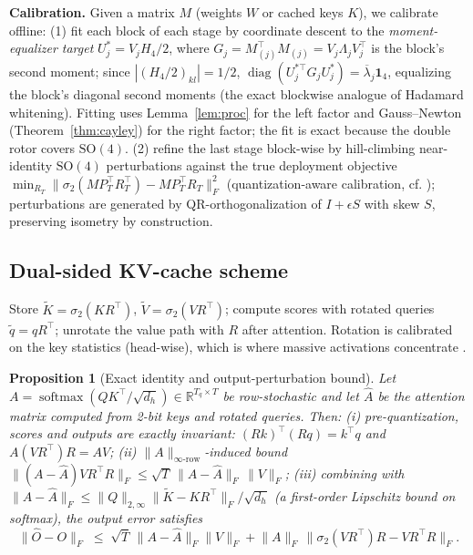 \documentclass{article}
\newtheorem{proposition}{Proposition}
\newcommand{\R}{\mathbb{R}}
\newcommand{\SO}{\mathrm{SO}}
\newcommand{\norm}[1]{\lVert #1 \rVert}
\begin{document}
\textbf{Calibration.} Given a matrix $M$ (weights $W$ or cached keys $K$), we
calibrate offline: (1) fit each block of each stage by coordinate descent to
the \emph{moment-equalizer target}
$U^{*}_j=V_jH_4/2$, where $G_j=M_{(j)}^\top M_{(j)}=V_j\Lambda_jV_j^\top$ is
the block's second moment; since $|(H_4/2)_{kl}|=1/2$,
$\operatorname{diag}(U^{*\top}_jG_jU^{*}_j)=\overline{\lambda}_j\mathbf{1}_4$,
equalizing the block's diagonal second moments (the exact blockwise analogue
of Hadamard whitening). Fitting uses Lemma~\ref{lem:proc} for the left factor
and Gauss--Newton (Theorem~\ref{thm:cayley}) for the right factor; the fit is
exact because the double rotor covers $\SO(4)$. (2) refine the last stage
block-wise by hill-climbing near-identity $\SO(4)$ perturbations against the
true deployment objective
$\min_{R_T}\norm{\sigma_2(MP_T^\top R_T^\top)-MP_T^\top R_T}_F^2$
(quantization-aware calibration, cf. \citep{tseng2024quipsharp,su2025rotatekv});
perturbations are generated by QR-orthogonalization of $I+\epsilon S$ with
skew $S$, preserving isometry by construction.

\subsection{Dual-sided KV-cache scheme}
\label{sec:kv}

Store $\tilde K=\sigma_2(KR^\top)$, $\tilde V=\sigma_2(VR^\top)$; compute
scores with rotated queries $\tilde q=qR^\top$; unrotate the value path with
$R$ after attention. Rotation is calibrated on the key statistics
(head-wise), which is where massive activations concentrate
\citep{sun2024massive,su2025rotatekv}.

\begin{proposition}[Exact identity and output-perturbation bound]
\label{prop:kv}
Let $A=\operatorname{softmax}(QK^\top/\sqrt{d_h})\in\R^{T_q\times T}$ be
row-stochastic and let $\widehat A$ be the attention matrix computed from
2-bit keys and rotated queries. Then:
(i) pre-quantization, scores and outputs are exactly invariant:
$(Rk)^\top(Rq)=k^\top q$ and $A(VR^\top)R=AV$;
(ii) $\norm{A}_{\infty\text{-row}}$-induced bound
$\norm{(A-\widehat A)VR^\top R}_F\le\sqrt{T}\,\norm{A-\widehat A}_F\,\norm{V}_F$;
(iii) combining with
$\norm{A-\widehat A}_F\le\norm{Q}_{2,\infty}\norm{\tilde K-KR^\top}_F/\sqrt{d_h}$
(a first-order Lipschitz bound on softmax), the output error satisfies
\[
\norm{\widehat O-O}_F\;\le\;\sqrt{T}\,\norm{A-\widehat A}_F\norm{V}_F
+\norm{A}_{F}\,\norm{\sigma_2(VR^\top)R-VR^\top R}_F .
\]
\end{proposition}
\end{document}
